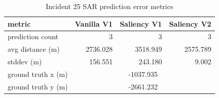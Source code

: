\begin{table}[ht]
\centering
\caption{Incident 25 SAR prediction error metrics}
\label{tab:sar-incident-25}
\begin{tabular}{lrrr}
\hline
metric & Vanilla V1 & Saliency V1 & Saliency V2 \\
\hline
prediction count & 3 & 3 & 3 \\
avg distance (m) & 2736.028 & 3518.949 & 2575.789 \\
stddev (m) & 156.551 & 243.180 & 9.002 \\
ground truth x (m) & \multicolumn{3}{c}{-1037.935} \\
ground truth y (m) & \multicolumn{3}{c}{-2661.232} \\
\hline
\end{tabular}
\end{table}
